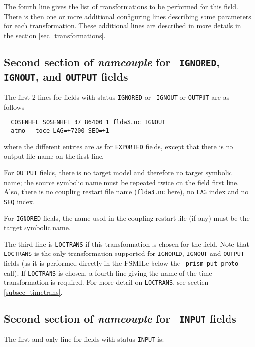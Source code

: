   The fourth line gives the list of transformations to be performed
  for this field. There is then one or more additional configuring lines
  describing some parameters for each transformation. These
  additional lines are described in more details in the section
  \ref{sec_transformations}.

\subsection{Second section of {\it namcouple} for {\tt
  IGNORED}, {\tt IGNOUT}, and {\tt OUTPUT} fields}
\label{subsubsec_secondIGNORED}
  The first 2 lines for fields with status {\tt IGNORED} or {\tt
  IGNOUT} or {\tt OUTPUT} are as follows:
  \begin{verbatim}
  COSENHFL SOSENHFL 37 86400 1 flda3.nc IGNOUT 
  atmo   toce LAG=+7200 SEQ=+1\end{verbatim}where the different
  entries are as for {\tt EXPORTED} fields, except that there is no
  output file name on the first line.

  For {\tt OUTPUT} fields, there is no target model and therefore no
  target symbolic name; the source symbolic name must be repeated
  twice on the field first line. Also, there is no coupling restart
  file name ({\tt flda3.nc} here), no {\tt LAG} index and no {\tt SEQ}
  index.

  For {\tt IGNORED} fields, the name used in the coupling restart file
  (if any) must be the target symbolic name.

\vspace*{0.5cm}

  The third line is {\tt LOCTRANS} if this transformation is chosen
  for the field. Note that {\tt LOCTRANS} is the only transformation
  supported for {\tt IGNORED}, {\tt IGNOUT} and {\tt OUTPUT} fields
  (as it is performed directly in the PSMILe below the {\tt
  prism\_put\_proto} call). If {\tt LOCTRANS} is chosen, a fourth line
  giving the name of the time transformation is required. For more
  detail on {\tt LOCTRANS}, see section \ref{subsec_timetrans}.

\subsection{Second section of {\it namcouple} for {\tt
  INPUT} fields}
\label{subsubsec_secondINPUT}

  The first and only line for fields with status {\tt INPUT} is:

